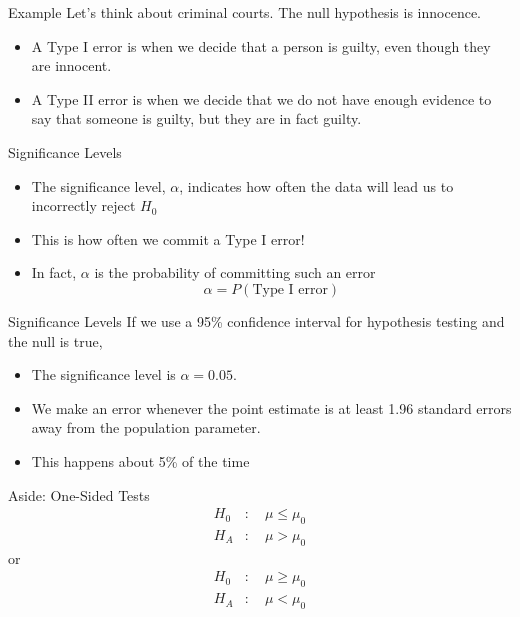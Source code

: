 \begin{frame}{Example}
    Let's think about criminal courts. The null hypothesis is innocence.
    
    \begin{itemize}
        \item A Type I error is when we decide that a person is guilty, even though they are innocent.
        \item A Type II error is when we decide that we do not have enough evidence to say that someone is guilty, but they are in fact guilty.
    \end{itemize}
\end{frame}

\begin{frame}{Significance Levels}
    \begin{itemize}
        \item The significance level, $\alpha$, indicates how often the data will lead us to incorrectly reject $H_0$
        \item This is how often we commit a Type I error!
        \item In fact, $\alpha$ is the probability of committing such an error
        \[
            \alpha = P(\text{Type I error})
        \]
    \end{itemize}
\end{frame}

\begin{frame}{Significance Levels}
    If we use a 95\% confidence interval for hypothesis testing and the null is true,
    \begin{itemize}
        \item The significance level is $\alpha=0.05$.
        \item We make an error whenever the point estimate is at least 1.96 standard errors away from the population parameter.
        \item This happens about 5\% of the time
    \end{itemize}
\end{frame}

\begin{frame}{Aside: One-Sided Tests}
    \begin{align*}
        H_0&: \quad \mu \le \mu_0 \\
        H_A&: \quad \mu > \mu_0
    \end{align*}
    or
    \begin{align*}
        H_0&: \quad \mu \ge \mu_0 \\
        H_A&: \quad \mu < \mu_0
    \end{align*}
\end{frame}

